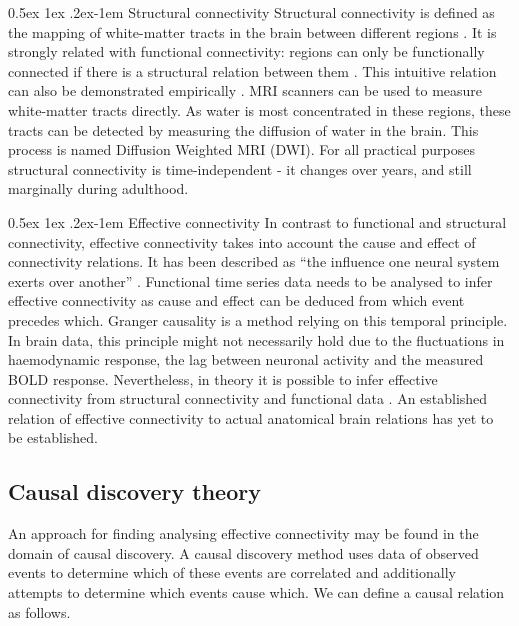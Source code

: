 \documentclass[a4paper, 10pt, english, onecolumn]{article}
\makeatletter
\renewcommand{\paragraph}{%
  \@startsection{paragraph}{4}%
  {\z@}{0.5ex \@plus 1ex \@minus .2ex}{-1em}%
  {\normalfont\normalsize\bfseries}%
}
\makeatother
\begin{document}
\paragraph{Structural connectivity}
Structural connectivity is defined as the mapping of white-matter tracts in the brain between different regions \cite{friston1994}.
It is strongly related with functional connectivity: regions can only be functionally connected if there is a structural relation between them \cite{cabral2012}.
This intuitive relation can also be demonstrated empirically \cite{vandenheuvel2009}.
MRI scanners can be used to measure white-matter tracts directly.
As water is most concentrated in these regions, these tracts can be detected by measuring the diffusion of water in the brain.
This process is named Diffusion Weighted MRI (DWI).
For all practical purposes structural connectivity is time-independent - it changes over years, and still marginally during adulthood.

\paragraph{Effective connectivity}
In contrast to functional and structural connectivity, effective connectivity takes into account the cause and effect of connectivity relations.
It has been described as ``the influence one neural system exerts over another'' \cite{friston1994}.
Functional time series data needs to be analysed to infer effective connectivity as cause and effect can be deduced from which event precedes which.
Granger causality is a method relying on this temporal principle.
In brain data, this principle might not necessarily hold due to the fluctuations in haemodynamic response, the lag between neuronal activity and the measured BOLD response.
Nevertheless, in theory it is possible to infer effective connectivity from structural connectivity and functional data \cite{mclntosh1994, harrison2003, friston2003, roebroeck2005}.
An established relation of effective connectivity to actual anatomical brain relations has yet to be established.

\subsection{Causal discovery theory}
An approach for finding analysing effective connectivity may be found in the domain of causal discovery.
A causal discovery method uses data of observed events to determine which of these events are correlated and additionally attempts to determine which events cause which.
We can define a causal relation as follows.
\end{document}
